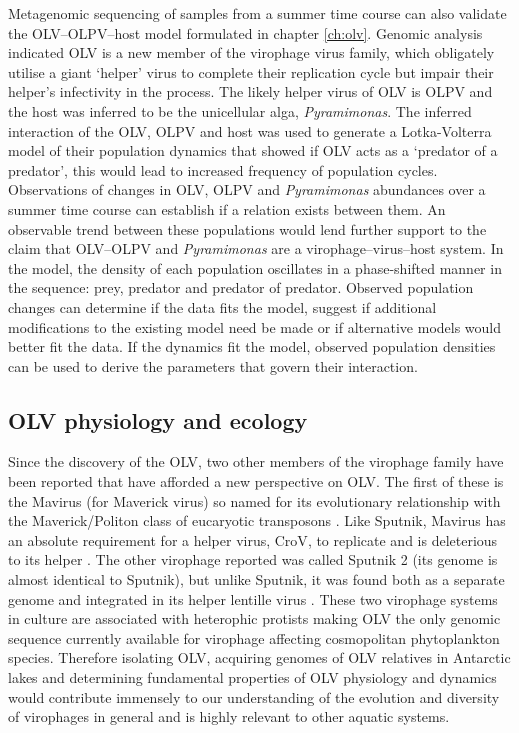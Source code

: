 Metagenomic sequencing of samples from a summer time course can also validate the \ac{OLV}--\ac{OLPV}--host model formulated in chapter \ref{ch:olv}.
Genomic analysis indicated \ac{OLV} is a new member of the virophage virus family, which obligately utilise a  giant `helper' virus to complete their replication cycle but impair their helper's infectivity in the process.
The likely helper virus of \ac{OLV} is \ac{OLPV} and the host was inferred to be the unicellular alga, \emph{Pyramimonas}.
The inferred interaction of the \ac{OLV}, \ac{OLPV} and host was used to generate a Lotka-Volterra model of their population dynamics that showed if \ac{OLV} acts as a `predator of a predator', this would lead to increased frequency of population cycles.
Observations of changes in \ac{OLV}, \ac{OLPV} and \emph{Pyramimonas} abundances over a summer time course can establish if a relation exists between them.
An observable trend between these populations would lend further support to the claim that \ac{OLV}--\ac{OLPV} and \emph{Pyramimonas} are a virophage--virus--host system.
In the model, the density of each population oscillates in a phase-shifted manner in the sequence: prey, predator and predator of predator.
Observed population changes can determine if the data fits the model, suggest if additional modifications to the existing model need be made or if alternative models would better fit the data.
If the dynamics fit the model, observed population densities can be used to derive the parameters that govern their interaction.

\subsection{\acs{OLV} physiology and ecology}
Since the discovery of the \ac{OLV}, two other members of the virophage family have been reported that have afforded a new perspective on \ac{OLV}.
The first of these is the Mavirus (for Maverick virus) so named for its evolutionary relationship with the Maverick/Politon class of eucaryotic transposons \cite{Fischer2011a}.
Like Sputnik, Mavirus has an absolute requirement for a helper virus, \ac{CroV}, to replicate and is deleterious to its helper \cite{Fischer2011a}.
The other virophage reported was called Sputnik 2 (its genome is almost identical to Sputnik), but unlike Sputnik, it was found both as a separate genome and integrated in its helper lentille virus \cite{Desnues2012}.
These two virophage systems in culture are associated with heterophic protists making \ac{OLV} the only genomic sequence currently available for virophage affecting cosmopolitan phytoplankton species.
Therefore isolating \ac{OLV}, acquiring genomes of \ac{OLV} relatives in Antarctic lakes and determining fundamental properties of \ac{OLV} physiology and dynamics would contribute immensely to our understanding of the evolution and diversity of virophages in general and is highly relevant to other aquatic systems.

